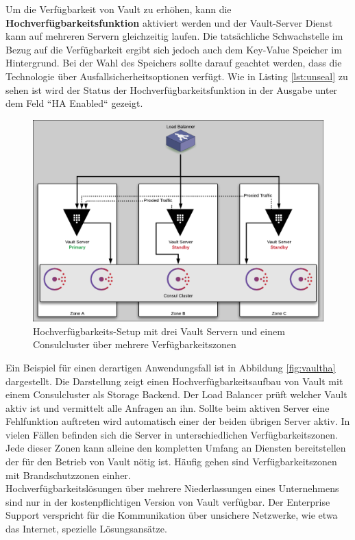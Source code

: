 \documentclass[
book,
a4paper,   
titlepage,  
halfparskip,
12pt        
]{scrartcl}
\begin{document}
\begin{onehalfspacing}
Um die Verfügbarkeit von Vault zu erhöhen, kann die \textbf{Hochverfügbarkeitsfunktion} aktiviert werden und der Vault-Server Dienst kann auf mehreren Servern gleichzeitig laufen. Die tatsächliche Schwachstelle im Bezug auf die Verfügbarkeit ergibt sich jedoch auch dem Key-Value Speicher im Hintergrund. Bei der Wahl des Speichers sollte darauf geachtet werden, dass die Technologie über Ausfallsicherheitsoptionen verfügt. Wie in Listing \vref{lst:unseal} zu sehen ist wird der Status der Hochverfügbarkeitsfunktion in der Ausgabe unter dem Feld ``HA Enabled`` gezeigt.\\

\begin{figure}[h]
	\centering
	\includegraphics[width=1\linewidth]{vaultha.png}
	\caption[Vault High Availability]{Hochverfügbarkeits-Setup mit drei Vault Servern und einem Consulcluster über mehrere Verfügbarkeitszonen\cite{vaultha}}
	\label{fig:vaultha}
\end{figure}

Ein Beispiel für einen derartigen Anwendungsfall ist in Abbildung \vref{fig:vaultha} dargestellt. Die Darstellung zeigt einen Hochverfügbarkeitsaufbau von Vault mit einem Consulcluster als Storage Backend. Der Load Balancer prüft welcher Vault aktiv ist und vermittelt alle Anfragen an ihn. Sollte beim aktiven Server eine Fehlfunktion auftreten wird automatisch einer der beiden übrigen Server aktiv. In vielen Fällen befinden sich die Server in unterschiedlichen Verfügbarkeitszonen. Jede dieser Zonen kann alleine den kompletten Umfang an Diensten bereitstellen der für den Betrieb von Vault nötig ist. Häufig gehen sind Verfügbarkeitszonen mit Brandschutzzonen einher.\\Hochverfügbarkeitslösungen über mehrere Niederlassungen eines Unternehmens sind nur in der kostenpflichtigen Version von Vault verfügbar. Der Enterprise Support verspricht für die Kommunikation über unsichere Netzwerke, wie etwa das Internet, spezielle Lösungsansätze\cite{enterprise}.
 

\end{onehalfspacing}
\end{document}
